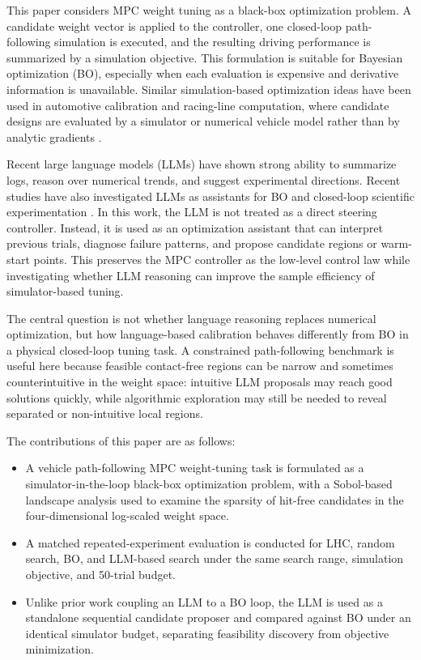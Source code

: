 \documentclass[10pt,twocolumn]{ICCAS}
\begin{document}
This paper considers MPC weight tuning as a black-box optimization problem. A candidate weight vector is applied to the controller, one closed-loop path-following simulation is executed, and the resulting driving performance is summarized by a simulation objective. This formulation is suitable for Bayesian optimization (BO), especially when each evaluation is expensive and derivative information is unavailable. Similar simulation-based optimization ideas have been used in automotive calibration and racing-line computation, where candidate designs are evaluated by a simulator or numerical vehicle model rather than by analytic gradients \cite{jain2020computing,arya2019fully}.

Recent large language models (LLMs) have shown strong ability to summarize logs, reason over numerical trends, and suggest experimental directions. Recent studies have also investigated LLMs as assistants for BO and closed-loop scientific experimentation \cite{liu2024large,cisse2025language,cisse2026can}. In this work, the LLM is not treated as a direct steering controller. Instead, it is used as an optimization assistant that can interpret previous trials, diagnose failure patterns, and propose candidate regions or warm-start points. This preserves the MPC controller as the low-level control law while investigating whether LLM reasoning can improve the sample efficiency of simulator-based tuning.

The central question is not whether language reasoning replaces numerical optimization, but how language-based calibration behaves differently from BO in a physical closed-loop tuning task. A constrained path-following benchmark is useful here because feasible contact-free regions can be narrow and sometimes counterintuitive in the weight space: intuitive LLM proposals may reach good solutions quickly, while algorithmic exploration may still be needed to reveal separated or non-intuitive local regions.

The contributions of this paper are as follows:
\begin{itemize}
    \item A vehicle path-following MPC weight-tuning task is formulated as a simulator-in-the-loop black-box optimization problem, with a Sobol-based landscape analysis used to examine the sparsity of hit-free candidates in the four-dimensional log-scaled weight space.
    \item A matched repeated-experiment evaluation is conducted for LHC, random search, BO, and LLM-based search under the same search range, simulation objective, and 50-trial budget.
    \item Unlike prior work coupling an LLM to a BO loop, the LLM is used as a standalone sequential candidate proposer and compared against BO under an identical simulator budget, separating feasibility discovery from objective minimization.
\end{itemize}
\end{document}
